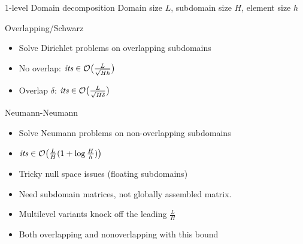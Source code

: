 \begin{frame}{1-level Domain decomposition}
  Domain size $L$, subdomain size $H$, element size $h$
  \begin{block}{Overlapping/Schwarz}
    \begin{itemize}\item Solve Dirichlet problems on overlapping
      subdomains
    \item No overlap: $\textit{its} \in \mathcal{O}\big( \frac{L}{\sqrt{Hh}} \big)$
    \item Overlap $\delta$: $\textit{its} \in \mathcal{O}\big( \frac L {\sqrt{H\delta}} \big)$
    \end{itemize}
  \end{block}
  \vspace{-1ex}
  \begin{block}{Neumann-Neumann}
    \begin{itemize}
    \item Solve Neumann problems on non-overlapping subdomains
    \item $\textit{its} \in \mathcal{O}\big( \frac{L}{H}(1+\log\frac H h) \big)$
    \item Tricky null space issues (floating subdomains)
    \item Need subdomain matrices, not globally assembled matrix.
    \end{itemize}
  \end{block}
  \begin{itemize}
  \item Multilevel variants knock off the leading $\frac L H$
  \item Both overlapping and nonoverlapping with this bound
  \end{itemize}
\end{frame}

